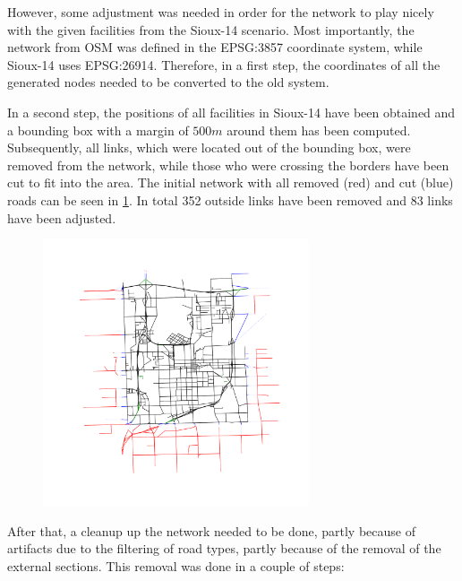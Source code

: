 However, some adjustment was needed in order for the network to play nicely with
the given facilities from the Sioux-14 scenario. Most importantly, the network from
OSM was defined in the EPSG:3857 coordinate system, while Sioux-14 uses EPSG:26914.
Therefore, in a first step, the coordinates of all the generated nodes needed to
be converted to the old system.

In a second step, the positions of all facilities in Sioux-14 have been obtained
and a bounding box with a margin of $500m$ around them has been computed. Subsequently,
all links, which were located out of the bounding box, were removed from the network,
while those who were crossing the borders have been cut to fit into the area. The
initial network with all removed (red) and cut (blue) roads can be seen in \cref{fig:sioux_step2}.
In total 352 outside links have been removed and 83 links have been adjusted.

\begin{figure}
    \centering
    \includegraphics[width=0.7\textwidth]{figures/sioux_step2.pdf}
    \caption{}
    \label{fig:sioux_step2}
\end{figure}

After that, a cleanup up the network needed to be done, partly because of artifacts
due to the filtering of road types, partly because of the removal of the external
sections. This removal was done in a couple of steps:


